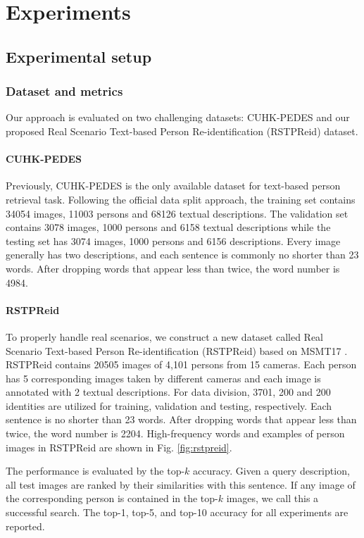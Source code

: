 \documentclass[sigconf]{acmart}
\begin{document}
\section{Experiments}
\subsection{Experimental setup}
\subsubsection{Dataset and metrics}
Our approach is evaluated on two challenging datasets: CUHK-PEDES \cite{Shuang2017Person} and our proposed Real Scenario Text-based Person Re-identification (RSTPReid) dataset.

\paragraph{CUHK-PEDES} Previously, CUHK-PEDES \cite{Shuang2017Person} is the only available dataset for text-based person retrieval task. Following the official data split approach, the training set contains 34054 images, 11003 persons and 68126 textual descriptions. The validation set contains 3078 images, 1000 persons and 6158 textual descriptions while the testing set has 3074 images, 1000 persons and 6156 descriptions. Every image generally has two descriptions, and each sentence is commonly no shorter than 23 words. After dropping words that appear less than twice, the word number is 4984.

\paragraph{RSTPReid} To properly handle real scenarios, we construct a new dataset called Real Scenario Text-based Person Re-identification (RSTPReid) based on MSMT17 \cite{MSMT17}. RSTPReid contains 20505 images of 4,101 persons from 15 cameras. Each person has 5 corresponding images taken by different cameras and each image is annotated with 2 textual descriptions. For data division, 3701, 200 and 200 identities are utilized for training, validation and testing, respectively. Each sentence is no shorter than 23 words. After dropping words that appear less than twice, the word number is 2204. High-frequency words and examples of person images in RSTPReid are shown in Fig. \ref{fig:rstpreid}.

The performance is evaluated by the top-$k$ accuracy. Given a query description, all test images are ranked by their similarities with this sentence. If any image of the corresponding person is contained in the top-$k$ images, we call this a successful search. The top-1, top-5, and top-10 accuracy for all experiments are reported.
\end{document}
